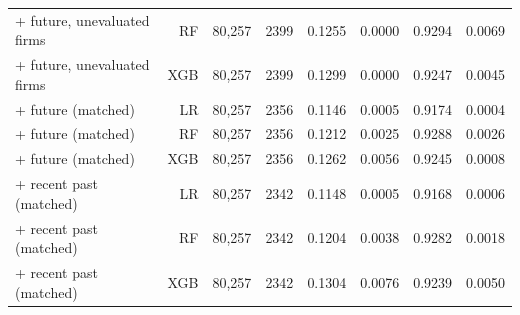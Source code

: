 \begin{table}[htbp]
{\begin{tabular}{lrrrrrrr}
+ future, unevaluated firms & RF & 80,257 & 2399 & 0.1255 & 0.0000 & 0.9294 & 0.0069 \\
+ future, unevaluated firms & XGB & 80,257 & 2399 & 0.1299 & 0.0000 & 0.9247 & 0.0045 \\
+ future (matched) & LR & 80,257 & 2356 & 0.1146 & 0.0005 & 0.9174 & 0.0004 \\
+ future (matched) & RF & 80,257 & 2356 & 0.1212 & 0.0025 & 0.9288 & 0.0026 \\
+ future (matched) & XGB & 80,257 & 2356 & 0.1262 & 0.0056 & 0.9245 & 0.0008 \\
+ recent past (matched) & LR & 80,257 & 2342 & 0.1148 & 0.0005 & 0.9168 & 0.0006 \\
+ recent past (matched) & RF & 80,257 & 2342 & 0.1204 & 0.0038 & 0.9282 & 0.0018 \\
+ recent past (matched) & XGB & 80,257 & 2342 & 0.1304 & 0.0076 & 0.9239 & 0.0050 \\
\bottomrule
\end{tabular}
}
\end{table}

